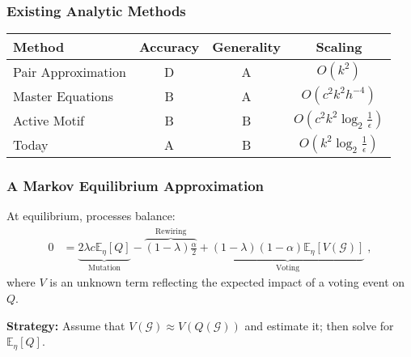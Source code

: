 \documentclass{beamer}
\newcommand\E[0]{\mathbb{E}}
\begin{document}
		\begin{frame}\frametitle{Existing Analytic Methods}

			\begin{tabular}{l | c | c | c }
				Method & Accuracy & Generality &  Scaling \\ 
				\hline
				Pair Approximation\footnotemark & D & A &$O(k^2)$ \\ 
				Master Equations\footnotemark[\value{footnote}]\footnotetext{\tiny{\fullcite{Durrett2012}}} 
				& B & A & $O(c^2 k^2 h^{-4})$ \\ 
				Active Motif\footfullcite{Demirel2012} & B & B & $O(c^2k^2\log_2\frac{1}{\epsilon})$\\ 
				Today & A & B & $O(k^2\log_2\frac{1}{\epsilon})$
			\end{tabular}


		\end{frame}
	
		
		\begin{frame}\frametitle{A Markov Equilibrium Approximation}
			At equilibrium, processes balance: 
			\begin{align*}
				0 &= \underbrace{2\lambda c\E_\eta[Q]}_{\text{Mutation}}  - \overbrace{(1-\lambda)\frac{\alpha}{2}}^{\text{Rewiring}} + \underbrace{(1-\lambda)(1-\alpha)\mathbb{E}_\eta[V(\mathcal{G})]}_{\text{Voting}}\;, 
			\end{align*}
			where $V$ is an unknown term reflecting the expected impact of a voting event on $Q$. 

			\textbf{Strategy:} Assume that $V(\mathcal{G}) \approx V(Q(\mathcal{G}))$ and estimate it; then solve for $\E_\eta[Q]$.
		\end{frame}
	
\end{document}
